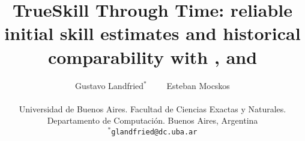 \documentclass[article]{jss}
\author{Gustavo Landfried$^*$ \ \ \ \ Esteban Mocskos \\ \\ \small Universidad de Buenos Aires. Facultad de Ciencias Exactas y Naturales. \\ Departamento de Computaci\'on. Buenos Aires, Argentina \\ \texttt{$^*$glandfried@dc.uba.ar}}
\title{
TrueSkill Through Time: reliable initial skill estimates and historical comparability with \proglang{Julia}, \proglang{Python} and \proglang{R}
}
\newif\ifen
\newif\ifes
\newcommand{\en}[1]{\ifen#1\fi}
\newcommand{\es}[1]{\ifes#1\fi}
\begin{document}


\section{\en{Introduction}} \label{sec:intro}

\en{Humans develop and acquire complex skills because of an special integration of biological, cognitive and social processes~\citep{Koster2020}. }%
\es{Los humanos desarrollamos habilidades complejas gracias a una integraci\'on especial de los procesos biol\'ogicos, cognitivos y sociales~\citep{Koster2020}. }%
%
\en{Our exceptional cognitive ability to imitate, combined with long periods of juvenile dependency and postreproductive life span, allows humans to learn things from others and transmit innovations through generations~\citep{Richerson2020}. }%
\es{Nuestra extraordinaria capacidad para imitar, combinada con los largos per\'iodos de aprendizaje juvenil y vida posreproductiva, permite a los humanos aprender de los dem\'as y transmitir las innovaci\'on a trav\'es de la generaciones~\citep{Richerson2020}. }%
%
\en{As a population-based process, human adaptation is also affected by demographic characteristics, such as the size and structure of populations~\citep{Derex2020}. }%
\es{Al ser un proceso poblacional, la adaptaci\'on humana tambi\'en se ve afectada por caracter\'isticas demogr\'aficas, como el tama\~no y estructura de las poblaciones~\citep{Derex2020}. }%

\end{document}
